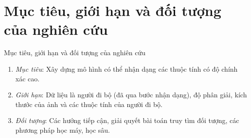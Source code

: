 \section{Mục tiêu, giới hạn và đối tượng của nghiên cứu}\label{sec:intro}
\frame{\tableofcontents[currentsection]}
\begin{frame}{Mục tiêu, giới hạn và đối tượng của nghiên cứu}
\begin{enumerate}
    \item <1-> \textit{Mục tiêu}: Xây dựng mô hình có thể nhận dạng các thuộc tính có độ chính xác cao.
    \item <2-> \textit{Giới hạn}: Dữ liệu là người đi bộ (đã qua bước nhận dạng), độ phân giải, kích thước của ảnh và các thuộc tính của người đi bộ.
    \item <3-> \textit{Đối tượng}: Các hướng tiếp cận, giải quyết bài toán truy tìm đối tượng, các phương pháp học máy, học sâu.
\end{enumerate}
\end{frame}

